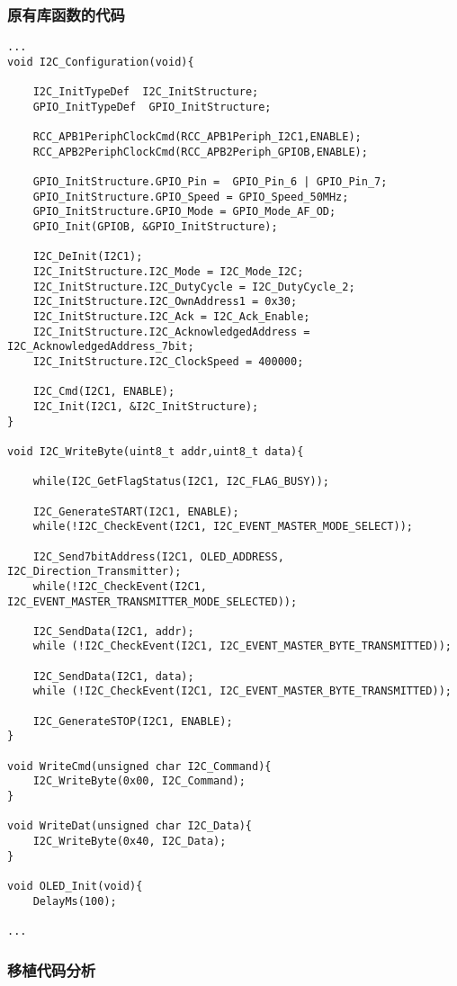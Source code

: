 \documentclass[cn,11pt]{elegantbook}
\begin{document}
\subsubsection{原有库函数的代码}
\lstset{language=C}
\begin{lstlisting}
...
void I2C_Configuration(void){

	I2C_InitTypeDef  I2C_InitStructure;
	GPIO_InitTypeDef  GPIO_InitStructure; 
	
	RCC_APB1PeriphClockCmd(RCC_APB1Periph_I2C1,ENABLE);
	RCC_APB2PeriphClockCmd(RCC_APB2Periph_GPIOB,ENABLE);
	
	GPIO_InitStructure.GPIO_Pin =  GPIO_Pin_6 | GPIO_Pin_7;
	GPIO_InitStructure.GPIO_Speed = GPIO_Speed_50MHz;
	GPIO_InitStructure.GPIO_Mode = GPIO_Mode_AF_OD;
	GPIO_Init(GPIOB, &GPIO_InitStructure);
	
	I2C_DeInit(I2C1);
	I2C_InitStructure.I2C_Mode = I2C_Mode_I2C;
	I2C_InitStructure.I2C_DutyCycle = I2C_DutyCycle_2;
	I2C_InitStructure.I2C_OwnAddress1 = 0x30;
	I2C_InitStructure.I2C_Ack = I2C_Ack_Enable;
	I2C_InitStructure.I2C_AcknowledgedAddress = I2C_AcknowledgedAddress_7bit;
	I2C_InitStructure.I2C_ClockSpeed = 400000;
	
	I2C_Cmd(I2C1, ENABLE);
	I2C_Init(I2C1, &I2C_InitStructure);
}

void I2C_WriteByte(uint8_t addr,uint8_t data){

	while(I2C_GetFlagStatus(I2C1, I2C_FLAG_BUSY));
	
	I2C_GenerateSTART(I2C1, ENABLE);
	while(!I2C_CheckEvent(I2C1, I2C_EVENT_MASTER_MODE_SELECT));
	
	I2C_Send7bitAddress(I2C1, OLED_ADDRESS, I2C_Direction_Transmitter);
	while(!I2C_CheckEvent(I2C1, I2C_EVENT_MASTER_TRANSMITTER_MODE_SELECTED));
	
	I2C_SendData(I2C1, addr);
	while (!I2C_CheckEvent(I2C1, I2C_EVENT_MASTER_BYTE_TRANSMITTED));
	
	I2C_SendData(I2C1, data);
	while (!I2C_CheckEvent(I2C1, I2C_EVENT_MASTER_BYTE_TRANSMITTED));
	
	I2C_GenerateSTOP(I2C1, ENABLE);
}

void WriteCmd(unsigned char I2C_Command){
	I2C_WriteByte(0x00, I2C_Command);
}

void WriteDat(unsigned char I2C_Data){
	I2C_WriteByte(0x40, I2C_Data);
}

void OLED_Init(void){
	DelayMs(100);

...
\end{lstlisting}

\subsubsection{移植代码分析}
\end{document}
